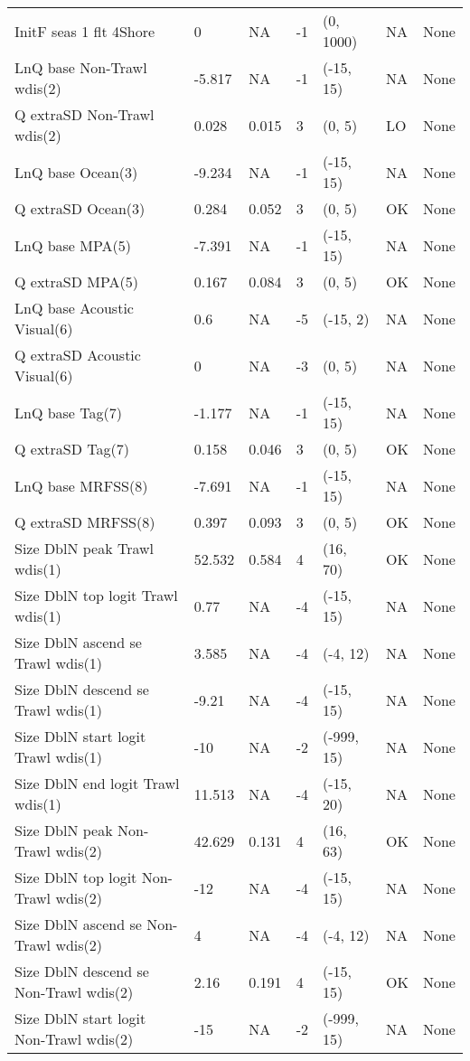 \documentclass[11pt,
  english,
  letterpaper,
]{article}
\begin{document}
\begin{landscape}
\begin{longtable}[t]{>{\raggedright\arraybackslash}p{7.5cm}lllll>{\raggedright\arraybackslash}p{3.5cm}}
InitF seas 1 flt 4Shore & 0 & NA & -1 & (0, 1000) & NA & None\\
LnQ base Non-Trawl wdis(2) & -5.817 & NA & -1 & (-15, 15) & NA & None\\
Q extraSD Non-Trawl wdis(2) & 0.028 & 0.015 & 3 & (0, 5) & LO & None\\
LnQ base Ocean(3) & -9.234 & NA & -1 & (-15, 15) & NA & None\\
Q extraSD Ocean(3) & 0.284 & 0.052 & 3 & (0, 5) & OK & None\\
LnQ base MPA(5) & -7.391 & NA & -1 & (-15, 15) & NA & None\\
Q extraSD MPA(5) & 0.167 & 0.084 & 3 & (0, 5) & OK & None\\
LnQ base Acoustic Visual(6) & 0.6 & NA & -5 & (-15, 2) & NA & None\\
Q extraSD Acoustic Visual(6) & 0 & NA & -3 & (0, 5) & NA & None\\
LnQ base Tag(7) & -1.177 & NA & -1 & (-15, 15) & NA & None\\
Q extraSD Tag(7) & 0.158 & 0.046 & 3 & (0, 5) & OK & None\\
LnQ base MRFSS(8) & -7.691 & NA & -1 & (-15, 15) & NA & None\\
Q extraSD MRFSS(8) & 0.397 & 0.093 & 3 & (0, 5) & OK & None\\
Size DblN peak Trawl wdis(1) & 52.532 & 0.584 & 4 & (16, 70) & OK & None\\
Size DblN top logit Trawl wdis(1) & 0.77 & NA & -4 & (-15, 15) & NA & None\\
Size DblN ascend se Trawl wdis(1) & 3.585 & NA & -4 & (-4, 12) & NA & None\\
Size DblN descend se Trawl wdis(1) & -9.21 & NA & -4 & (-15, 15) & NA & None\\
Size DblN start logit Trawl wdis(1) & -10 & NA & -2 & (-999, 15) & NA & None\\
Size DblN end logit Trawl wdis(1) & 11.513 & NA & -4 & (-15, 20) & NA & None\\
Size DblN peak Non-Trawl wdis(2) & 42.629 & 0.131 & 4 & (16, 63) & OK & None\\
Size DblN top logit Non-Trawl wdis(2) & -12 & NA & -4 & (-15, 15) & NA & None\\
Size DblN ascend se Non-Trawl wdis(2) & 4 & NA & -4 & (-4, 12) & NA & None\\
Size DblN descend se Non-Trawl wdis(2) & 2.16 & 0.191 & 4 & (-15, 15) & OK & None\\
Size DblN start logit Non-Trawl wdis(2) & -15 & NA & -2 & (-999, 15) & NA & None\\

\end{longtable}
\end{landscape}
\end{document}

